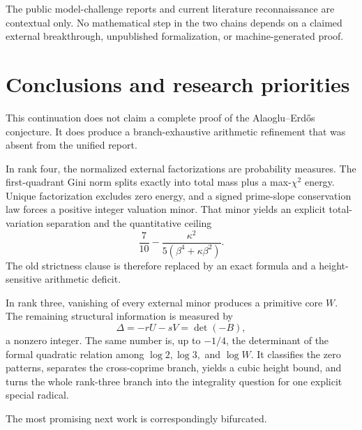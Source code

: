 \documentclass[11pt,oneside]{article}
\theoremstyle{research}
\theoremstyle{definition}
\begin{document}
The public model-challenge reports and current literature reconnaissance are
contextual only.  No mathematical step in the two chains depends on a claimed
external breakthrough, unpublished formalization, or machine-generated proof.

\section{Conclusions and research priorities}
\label{sec:conclusion}

This continuation does not claim a complete proof of the Alaoglu--Erdős
conjecture.  It does produce a branch-exhaustive arithmetic refinement that
was absent from the unified report.

In rank four, the normalized external factorizations are probability
measures.  The first-quadrant Gini norm splits exactly into total mass plus a
max-$\chi^2$ energy.  Unique factorization excludes zero energy, and a signed
prime-slope conservation law forces a positive integer valuation minor.
That minor yields an explicit total-variation separation and the quantitative
ceiling
\[
 \frac7{10}-
 \frac{\kappa^2}{5(\beta^4+\kappa\beta^2)}.
\]
The old strictness clause is therefore replaced by an exact formula and a
height-sensitive arithmetic deficit.

In rank three, vanishing of every external minor produces a primitive core
$W$.  The remaining structural information is measured by
\[
 \Delta=-rU-sV=\det(-B),
\]
a nonzero integer.  The same number is, up to $-1/4$, the determinant of the
formal quadratic relation among $\log2,\log3,$ and $\log W$.  It classifies the
zero patterns, separates the cross-coprime branch, yields a cubic height
bound, and turns the whole rank-three branch into the integrality question for
one explicit special radical.

The most promising next work is correspondingly bifurcated.
\end{document}
